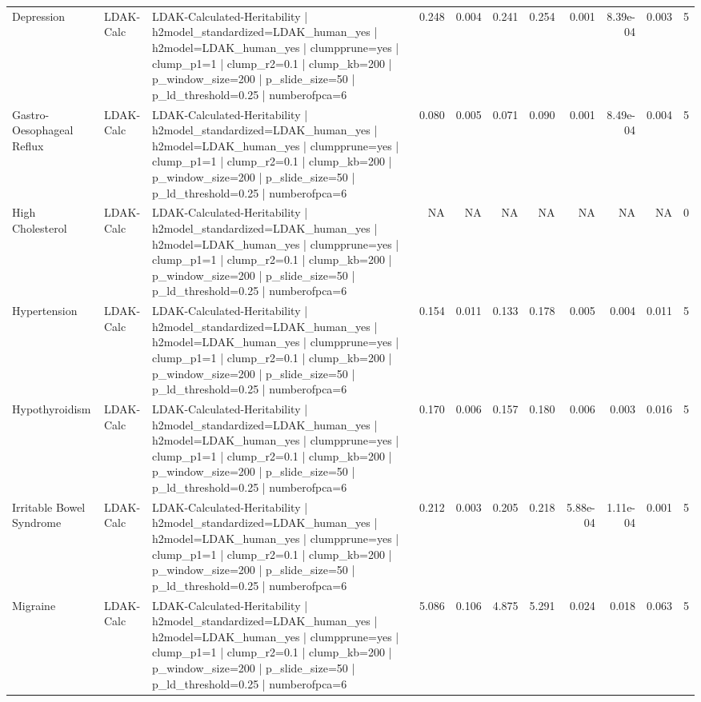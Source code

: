 \begin{landscape}
\begin{longtable}{p{2.4cm}p{1.8cm}p{6.0cm}rrrrrrrr}
Depression & LDAK-Calc & LDAK-Calculated-Heritability | h2model\_standardized=LDAK\_human\_yes | h2model=LDAK\_human\_yes | clumpprune=yes | clump\_p1=1 | clump\_r2=0.1 | clump\_kb=200 | p\_window\_size=200 | p\_slide\_size=50 | p\_ld\_threshold=0.25 | numberofpca=6 & 0.248 & 0.004 & 0.241 & 0.254 & 0.001 & 8.39e-04 & 0.003 & 5 \\
Gastro-Oesophageal Reflux & LDAK-Calc & LDAK-Calculated-Heritability | h2model\_standardized=LDAK\_human\_yes | h2model=LDAK\_human\_yes | clumpprune=yes | clump\_p1=1 | clump\_r2=0.1 | clump\_kb=200 | p\_window\_size=200 | p\_slide\_size=50 | p\_ld\_threshold=0.25 | numberofpca=6 & 0.080 & 0.005 & 0.071 & 0.090 & 0.001 & 8.49e-04 & 0.004 & 5 \\
High Cholesterol & LDAK-Calc & LDAK-Calculated-Heritability | h2model\_standardized=LDAK\_human\_yes | h2model=LDAK\_human\_yes | clumpprune=yes | clump\_p1=1 | clump\_r2=0.1 | clump\_kb=200 | p\_window\_size=200 | p\_slide\_size=50 | p\_ld\_threshold=0.25 | numberofpca=6 & NA & NA & NA & NA & NA & NA & NA & 0 \\
Hypertension & LDAK-Calc & LDAK-Calculated-Heritability | h2model\_standardized=LDAK\_human\_yes | h2model=LDAK\_human\_yes | clumpprune=yes | clump\_p1=1 | clump\_r2=0.1 | clump\_kb=200 | p\_window\_size=200 | p\_slide\_size=50 | p\_ld\_threshold=0.25 | numberofpca=6 & 0.154 & 0.011 & 0.133 & 0.178 & 0.005 & 0.004 & 0.011 & 5 \\
Hypothyroidism & LDAK-Calc & LDAK-Calculated-Heritability | h2model\_standardized=LDAK\_human\_yes | h2model=LDAK\_human\_yes | clumpprune=yes | clump\_p1=1 | clump\_r2=0.1 | clump\_kb=200 | p\_window\_size=200 | p\_slide\_size=50 | p\_ld\_threshold=0.25 | numberofpca=6 & 0.170 & 0.006 & 0.157 & 0.180 & 0.006 & 0.003 & 0.016 & 5 \\
Irritable Bowel Syndrome & LDAK-Calc & LDAK-Calculated-Heritability | h2model\_standardized=LDAK\_human\_yes | h2model=LDAK\_human\_yes | clumpprune=yes | clump\_p1=1 | clump\_r2=0.1 | clump\_kb=200 | p\_window\_size=200 | p\_slide\_size=50 | p\_ld\_threshold=0.25 | numberofpca=6 & 0.212 & 0.003 & 0.205 & 0.218 & 5.88e-04 & 1.11e-04 & 0.001 & 5 \\
Migraine & LDAK-Calc & LDAK-Calculated-Heritability | h2model\_standardized=LDAK\_human\_yes | h2model=LDAK\_human\_yes | clumpprune=yes | clump\_p1=1 | clump\_r2=0.1 | clump\_kb=200 | p\_window\_size=200 | p\_slide\_size=50 | p\_ld\_threshold=0.25 | numberofpca=6 & 5.086 & 0.106 & 4.875 & 5.291 & 0.024 & 0.018 & 0.063 & 5 \\

\end{longtable}
\end{landscape}
